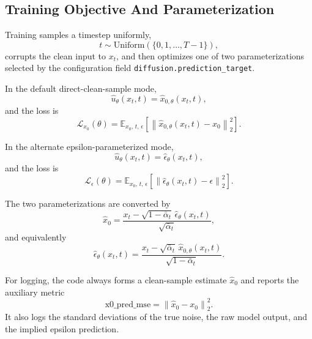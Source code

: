 \documentclass[11pt]{article}
\newcommand{\E}{\mathbb{E}}
\begin{document}
\subsection{Training Objective And Parameterization}
Training samples a timestep uniformly,
\begin{equation}
t \sim \mathrm{Uniform}\left(\{0,1,\dots,T-1\}\right),
\end{equation}
corrupts the clean input to $x_t$, and then optimizes one of two parameterizations selected by the configuration field \texttt{diffusion.prediction\_target}.

In the default direct-clean-sample mode,
\begin{equation}
\hat{u}_\theta(x_t,t) = \hat{x}_{0,\theta}(x_t,t),
\end{equation}
and the loss is
\begin{equation}
\mathcal{L}_{x_0}(\theta)
=
\E_{x_0,\,t,\,\epsilon}
\left[
\left\|
\hat{x}_{0,\theta}(x_t,t) - x_0
\right\|_2^2
\right].
\end{equation}

In the alternate epsilon-parameterized mode,
\begin{equation}
\hat{u}_\theta(x_t,t) = \hat{\epsilon}_\theta(x_t,t),
\end{equation}
and the loss is
\begin{equation}
\mathcal{L}_{\epsilon}(\theta)
=
\E_{x_0,\,t,\,\epsilon}
\left[
\left\|
\hat{\epsilon}_\theta(x_t,t) - \epsilon
\right\|_2^2
\right].
\end{equation}

The two parameterizations are converted by
\begin{equation}
\hat{x}_0 = \frac{x_t - \sqrt{1-\bar{\alpha}_t}\,\hat{\epsilon}_\theta(x_t,t)}{\sqrt{\bar{\alpha}_t}},
\end{equation}
and equivalently
\begin{equation}
\hat{\epsilon}_\theta(x_t,t)
=
\frac{x_t - \sqrt{\bar{\alpha}_t}\,\hat{x}_{0,\theta}(x_t,t)}{\sqrt{1-\bar{\alpha}_t}}.
\end{equation}

For logging, the code always forms a clean-sample estimate $\hat{x}_0$ and reports the auxiliary metric
\begin{equation}
\mathrm{x0\_pred\_mse} = \left\|\hat{x}_0 - x_0\right\|_2^2.
\end{equation}
It also logs the standard deviations of the true noise, the raw model output, and the implied epsilon prediction.
\end{document}
